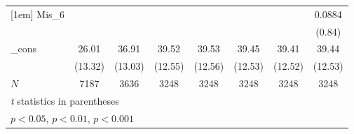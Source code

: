 \documentclass{article}
\begin{document}
{\begin{tabular}{l*{7}{c}}
[1em]
Mis\_6       &                     &                     &                     &                     &                     &                     &      0.0884         \\
            &                     &                     &                     &                     &                     &                     &      (0.84)         \\
[1em]
\_cons      &       26.01\sym{***}&       36.91\sym{***}&       39.52\sym{***}&       39.53\sym{***}&       39.45\sym{***}&       39.41\sym{***}&       39.44\sym{***}\\
            &     (13.32)         &     (13.03)         &     (12.55)         &     (12.56)         &     (12.53)         &     (12.52)         &     (12.53)         \\
\hline
\(N\)       &        7187         &        3636         &        3248         &        3248         &        3248         &        3248         &        3248         \\
\hline\hline
\multicolumn{8}{l}{\footnotesize \textit{t} statistics in parentheses}\\
\multicolumn{8}{l}{\footnotesize \sym{*} \(p<0.05\), \sym{**} \(p<0.01\), \sym{***} \(p<0.001\)}\\
\end{tabular}
}
\end{document}
